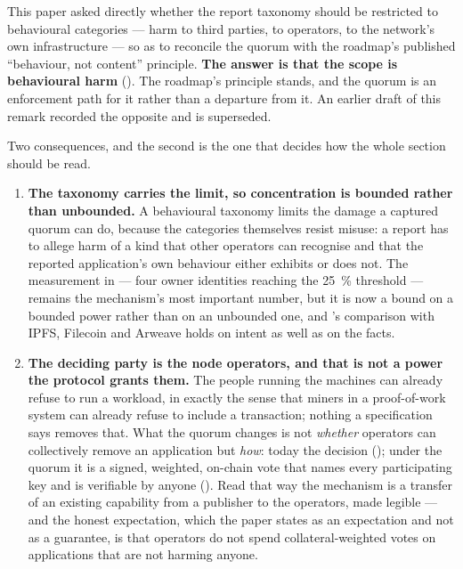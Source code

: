 \begin{remark}
\label{rem:content-veto}
This paper asked directly whether the report taxonomy should be restricted to behavioural categories
--- harm to third parties, to operators, to the network's own infrastructure --- so as to reconcile
the quorum with the roadmap's published ``behaviour, not content'' principle. \textbf{The answer is
that the scope is behavioural harm}  (\planned). The roadmap's principle
stands, and the quorum is an enforcement path for it rather than a departure from it. An earlier
draft of this remark recorded the opposite and is superseded.

Two consequences, and the second is the one that decides how the whole section should be read.

\begin{enumerate}
  \item \textbf{The taxonomy carries the limit, so concentration is bounded rather than unbounded.}
  A behavioural taxonomy limits the damage a captured quorum can do, because the categories
  themselves resist misuse: a report has to allege harm of a kind that other operators can recognise
  and that the reported application's own behaviour either exhibits or does not. The measurement in
   --- four owner identities reaching the \SI{25}{\percent} threshold ---
  remains the mechanism's most important number, but it is now a bound on a bounded power rather
  than on an unbounded one, and 's comparison with IPFS, Filecoin and Arweave
  holds on intent as well as on the facts.
  \item \textbf{The deciding party is the node operators, and that is not a power the protocol
  grants them.}  The people running the machines can already refuse to run
  a workload, in exactly the sense that miners in a proof-of-work system can already refuse to
  include a transaction; nothing a specification says removes that. What the quorum changes is not
  \emph{whether} operators can collectively remove an application but \emph{how}: today the decision
  (); under the quorum it is a signed, weighted, on-chain vote that names
  every participating key and is verifiable by anyone
  (). Read that way the mechanism is a transfer of an existing capability
  from a publisher to the operators, made legible --- and the honest expectation, which the paper
  states as an expectation and not as a guarantee, is that operators do not spend collateral-weighted
  votes on applications that are not harming anyone.
\end{enumerate}


\end{remark}

